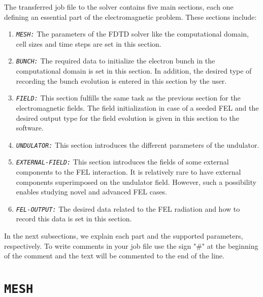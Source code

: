 The transferred job file to the solver contains five main sections, each one defining an essential part of the electromagnetic problem.
%
These sections include:
%
\begin{enumerate}
	\item {\tt \em \small MESH:} The parameters of the FDTD solver like the computational domain, cell sizes and time steps are set in this section.
	\item {\tt \em \small BUNCH:} The required data to initialize the electron bunch in the computational domain is set in this section. In addition, the desired type of recording the bunch evolution is entered in this section by the user.
	\item {\tt \em \small FIELD:} This section fulfills the same task as the previous section for the electromagnetic fields. The field initialization in case of a seeded FEL and the desired output type for the field evolution is given in this section to the software.
	\item {\tt \em \small UNDULATOR:} This section introduces the different parameters of the undulator.
	\item {\tt \em \small EXTERNAL-FIELD:} This section introduces the fields of some external components to the FEL interaction. It is relatively rare to have external components superimposed on the undulator field. However, such a possibility enables studying novel and advanced FEL cases.
	\item {\tt \em \small FEL-OUTPUT:} The desired data related to the FEL radiation and how to record this data is set in this section.
\end{enumerate}
%
In the next subsections, we explain each part and the supported parameters, respectively.
%
To write comments in your job file use the sign "\#" at the beginning of the comment and the text will be commented to the end of the line.

\section{\texttt{MESH}}

